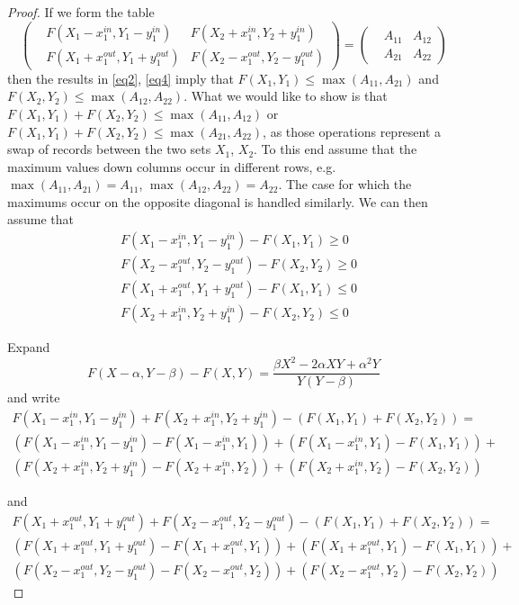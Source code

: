 \documentclass{article}
\theoremstyle{case}
\begin{document}
\begin{proof}
If we form the table
\[
\begin{pmatrix}
&F(X_1 - x_1^{in}, Y_1 - y_1^{in}) & F(X_2 + x_1^{in}, Y_2 + y_1^{in}) \\
&F(X_1 + x_1^{out}, Y_1 + y_1^{out}) & F(X_2 - x_1^{out}, Y_2 - y_1^{out})
\end{pmatrix} = \begin{pmatrix}
&A_{11} & A_{12} \\
&A_{21} & A_{22}
\end{pmatrix}
\]
then the results in \ref{eq2}, \ref{eq4} imply that $F(X_1, Y_1) \leq \max{\left(A_{11}, A_{21}\right)}$ and $F(X_2, Y_2) \leq \max{\left(A_{12}, A_{22}\right)}$. What we would like to show is that $F(X_1, Y_1) + F(X_2, Y_2) \leq \max{\left(A_{11}, A_{12}\right)}$ or $F(X_1, Y_1) + F(X_2, Y_2) \leq \max{\left(A_{21}, A_{22}\right)}$, as those operations represent a swap of records between the two sets $X_1$, $X_2$. To this end assume that the maximum values down columns occur in different rows, e.g. $\max{\left(A_{11}, A_{21}\right)} = A_{11}$, $\max{\left(A_{12}, A_{22}\right)} = A_{22}$. The case for which the maximums occur on the opposite diagonal is handled similarly. We can then assume that 
\begin{align}
& F(X_1 - x_1^{in}, Y_1 - y_1^{in}) - F(X_1, Y_1) \geq 0 \\
& F(X_2 - x_1^{out}, Y_2 - y_1^{out}) - F(X_2, Y_2) \geq 0 \\
& F(X_1 + x_1^{out}, Y_1 + y_1^{out}) - F(X_1, Y_1) \leq 0 \\
& F(X_2 + x_1^{in}, Y_2 + y_1^{in}) - F(X_2, Y_2) \leq 0
\end{align}

Expand 
\[
F(X - \alpha, Y - \beta) - F(X, Y) = \frac{\beta X^2 - 2\alpha XY + \alpha^2 Y}{Y\left( Y-\beta\right)}
\]
and write
\begin{align*}
F(X_1 - x_1^{in}, Y_1 - y_1^{in}) + F(X_2 + x_1^{in}, Y_2 + y_1^{in}) - \left( F(X_1, Y_1) + F(X_2, Y_2)\right) = \\
\left( F(X_1 - x_1^{in}, Y_1 - y_1^{in}) - F(X_1 - x_1^{in}, Y_1)\right) + \left( F(X_1 - x_1^{in}, Y_1) - F(X_1 , Y_1)\right) + \\
\left( F(X_2 + x_1^{in}, Y_2 + y_1^{in}) - F(X_2 + x_1^{in}, Y_2)\right) + \left( F(X_2 + x_1^{in}, Y_2) - F(X_2, Y_2)\right)
\end{align*}

and
\begin{align*}
F(X_1 + x_1^{out}, Y_1 + y_1^{out}) + F(X_2 - x_1^{out}, Y_2 - y_1^{out}) - \left( F(X_1, Y_1) + F(X_2, Y_2)\right) = \\
\left( F(X_1 + x_1^{out}, Y_1 + y_1^{out}) - F(X_1 + x_1^{out}, Y_1)\right) + \left( F(X_1 + x_1^{out}, Y_1) - F(X_1 , Y_1)\right) + \\
\left( F(X_2 - x_1^{out}, Y_2 - y_1^{out}) - F(X_2 - x_1^{out}, Y_2)\right) + \left( F(X_2 - x_1^{out}, Y_2) - F(X_2, Y_2)\right)
\end{align*}


\end{proof}
\end{document}
